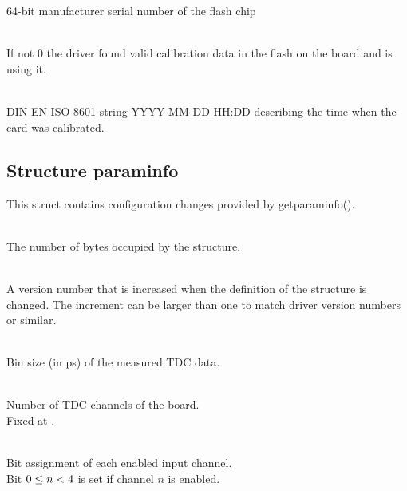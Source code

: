 \\
\\
64-bit manufacturer serial number of the flash chip

\\
If not 0 the driver found valid calibration data in the flash on the board and is using it.\par

\\
DIN EN ISO 8601 string YYYY-MM-DD HH:DD describing the time when the card was calibrated.


\subsection{Structure \prefix param\tu info}
This struct contains configuration changes provided by \textsf{\prefix get\tu param\tu info()}.

\\
The number of bytes occupied by the structure. \par

\\
A version number that is increased when the definition of the structure is changed. The increment can be larger than one to match driver version numbers or similar.\par


\\
Bin size (in ps) of the measured TDC data.


\\
Number of TDC channels of the board.\\
Fixed at .\par

\\
Bit assignment of each enabled input channel.\\
Bit $0 \leq n < \ifxHPTDC{8}{4}$ is set if channel $n$ is enabled. \par


